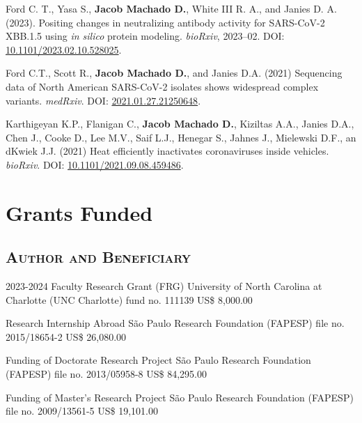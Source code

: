 \documentclass[11pt, letterpaper, sans]{moderncv}
\begin{document}
	{
		\setlength{\parskip}{.5em}\renewcommand{\baselinestretch}{2.0}
		\begin{hangparas}{.25in}{1}

		Ford C. T., Yasa S., \textbf{Jacob Machado D.}, White III R. A., and Janies D. A. (2023). Positing changes in neutralizing antibody activity for SARS-CoV-2 XBB.1.5 using \textit{in silico} protein modeling. \textit{bioRxiv}, 2023--02. DOI: \href{https://doi.org/10.1101/2023.02.10.528025}{10.1101/2023.02.10.528025}.

		Ford C.T., Scott R.,  \textbf{Jacob Machado D.}, and  Janies D.A. (2021) Sequencing data of North American SARS-CoV-2 isolates shows widespread complex variants. \textit{medRxiv}. DOI: \href{https://doi.org/10.1101/2021.01.27.21250648}{2021.01.27.21250648}.

		Karthigeyan K.P., Flanigan C., \textbf{Jacob Machado D.}, Kiziltas A.A., Janies D.A., Chen J., Cooke D., Lee M.V., Saif L.J., Henegar S., Jahnes J., Mielewski D.F., an dKwiek J.J. (2021) Heat efficiently inactivates coronaviruses inside vehicles. \textit{bioRxiv}. DOI: \href{https://doi.org/10.1101/2021.09.08.459486}{10.1101/2021.09.08.459486}.

		\end{hangparas}
	}


\section{Grants Funded}

\vspace{.5em}
	\subsection{\textsc{Author and Beneficiary}}
\vspace{.5em}

{2023-2024 Faculty Research Grant (FRG)}
{University of North Carolina at Charlotte (UNC Charlotte)}
{fund no. 111139}
{US\$ 8,000.00}{}

{Research Internship Abroad}
{São Paulo Research Foundation (FAPESP)}
{file no. 2015/18654-2}
{US\$ 26,080.00}{}

{Funding of Doctorate Research Project}
{São Paulo Research Foundation (FAPESP)}
{file no. 2013/05958-8}
{US\$ 84,295.00}{}

{Funding of Master's Research Project}
{São Paulo Research Foundation (FAPESP)}
{file no. 2009/13561-5}
{US\$ 19,101.00}{}
\end{document}
